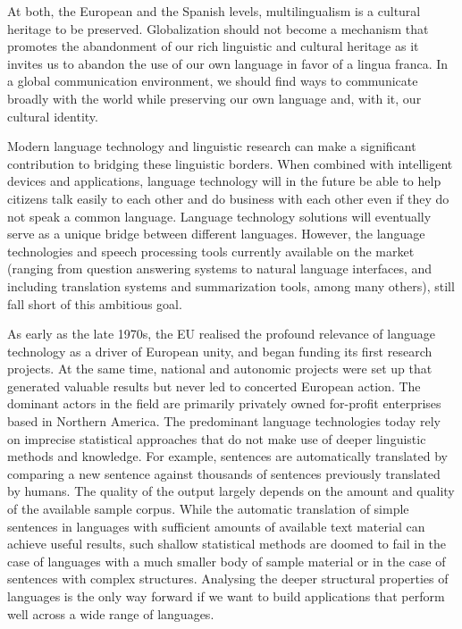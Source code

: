 \begin{multicols}{2}
At both, the European and the Spanish levels, multilingualism is a cultural heritage to be preserved. Globalization should not become a mechanism that promotes the abandonment of our rich linguistic and cultural heritage as it invites us to abandon the use of our own language in favor of a lingua franca. In a global communication environment, we should find ways to communicate broadly with the world while preserving our own language and, with it, our cultural identity.

Modern language technology and linguistic research can make a significant contribution to bridging these linguistic borders. When combined with intelligent devices and applications, language technology will in the future be able to help citizens talk easily to each other and do business with each other even if they do not speak a common language. Language technology solutions will eventually serve as a unique bridge between different languages. However, the language technologies and speech processing tools currently available on the market (ranging from question answering systems to natural language interfaces, and including translation systems and summarization tools, among many others), still fall short of this ambitious goal. 


As early as the late 1970s, the EU realised the profound relevance of language technology as a driver of European unity, and began funding its first research projects. At the same time, national and autonomic projects were set up that generated valuable results but never led to concerted European action. The dominant actors in the field are primarily privately owned for-profit enterprises based in Northern America. The predominant language technologies today rely on imprecise statistical approaches that do not make use of deeper linguistic methods and knowledge. For example, sentences are automatically translated by comparing a new sentence against thousands of sentences previously translated by humans. The quality of the output largely depends on the amount and quality of the available sample corpus. While the automatic translation of simple sentences in languages with sufficient amounts of available text material can achieve useful results, such shallow statistical methods are doomed to fail in the case of languages with a much smaller body of sample material or in the case of sentences with complex structures. Analysing the deeper structural properties of languages is the only way forward if we want to build applications that perform well across a wide range of languages.


\end{multicols}
